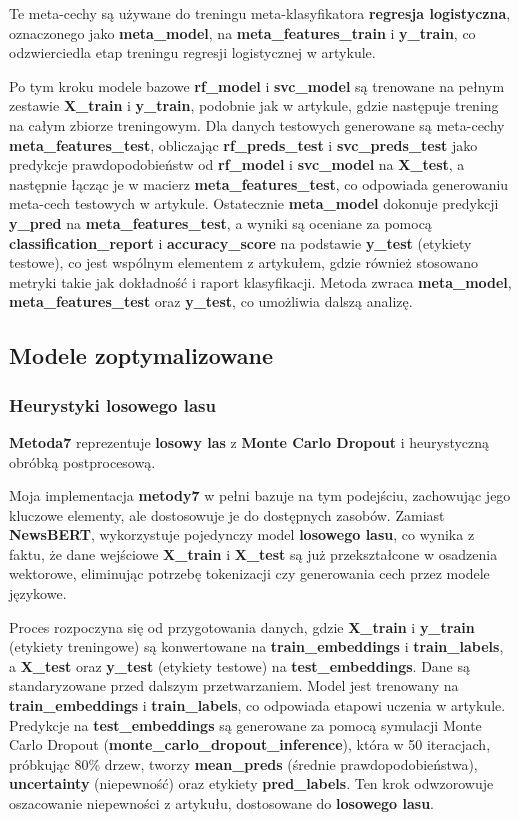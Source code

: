 Te meta-cechy są używane do treningu meta-klasyfikatora \textbf{regresja logistyczna}, oznaczonego jako \textbf{meta\_model}, na \textbf{meta\_features\_train} i \textbf{y\_train}, co odzwierciedla etap treningu regresji logistycznej w artykule.

Po tym kroku modele bazowe \textbf{rf\_model} i \textbf{svc\_model} są trenowane na pełnym zestawie \textbf{X\_train} i \textbf{y\_train}, podobnie jak w artykule, gdzie następuje trening na całym zbiorze treningowym. Dla danych testowych generowane są meta-cechy \textbf{meta\_features\_test}, obliczając \textbf{rf\_preds\_test} i \textbf{svc\_preds\_test} jako predykcje prawdopodobieństw od \textbf{rf\_model} i \textbf{svc\_model} na \textbf{X\_test}, a następnie łącząc je w macierz \textbf{meta\_features\_test}, co odpowiada generowaniu meta-cech testowych w artykule. Ostatecznie \textbf{meta\_model} dokonuje predykcji \textbf{y\_pred} na \textbf{meta\_features\_test}, a wyniki są oceniane za pomocą \textbf{classification\_report} i \textbf{accuracy\_score} na podstawie \textbf{y\_test} (etykiety testowe), co jest wspólnym elementem z artykułem, gdzie również stosowano metryki takie jak dokładność i raport klasyfikacji. Metoda zwraca \textbf{meta\_model}, \textbf{meta\_features\_test} oraz \textbf{y\_test}, co umożliwia dalszą analizę.

\subsection{Modele zoptymalizowane}
\subsubsection{Heurystyki losowego lasu}
\textbf{Metoda7} reprezentuje \textbf{losowy las} z \textbf{Monte Carlo Dropout} i heurystyczną obróbką postprocesową.

Moja implementacja \textbf{metody7} w pełni bazuje na tym podejściu, zachowując jego kluczowe elementy, ale dostosowuje je do dostępnych zasobów. Zamiast \textbf{NewsBERT}, wykorzystuje pojedynczy model \textbf{losowego lasu}, co wynika z faktu, że dane wejściowe \textbf{X\_train} i \textbf{X\_test} są już przekształcone w osadzenia wektorowe, eliminując potrzebę tokenizacji czy generowania cech przez modele językowe.

Proces rozpoczyna się od przygotowania danych, gdzie \textbf{X\_train} i \textbf{y\_train} (etykiety treningowe) są konwertowane na \textbf{train\_embeddings} i \textbf{train\_labels}, a \textbf{X\_test} oraz \textbf{y\_test} (etykiety testowe) na \textbf{test\_embeddings}. Dane są standaryzowane przed dalszym przetwarzaniem. Model jest trenowany na \textbf{train\_embeddings} i \textbf{train\_labels}, co odpowiada etapowi uczenia w artykule. Predykcje na \textbf{test\_embeddings} są generowane za pomocą symulacji Monte Carlo Dropout (\textbf{monte\_carlo\_dropout\_inference}), która w 50 iteracjach, próbkując 80\% drzew, tworzy \textbf{mean\_preds} (średnie prawdopodobieństwa), \textbf{uncertainty} (niepewność) oraz etykiety \textbf{pred\_labels}. Ten krok odwzorowuje oszacowanie niepewności z artykułu, dostosowane do \textbf{losowego lasu}.

